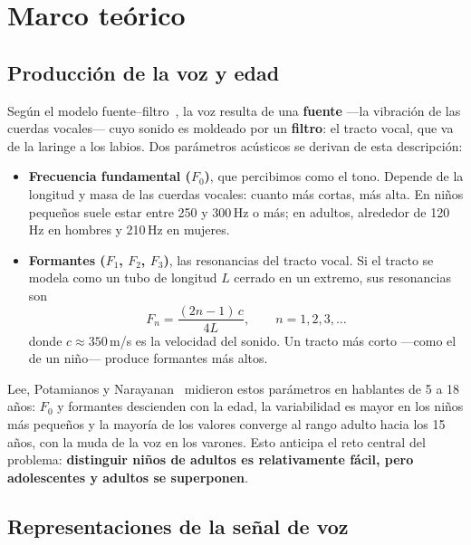 \documentclass[11pt,a4paper]{article}
\begin{document}
\section{Marco teórico}
\label{sec:marco}

\subsection{Producción de la voz y edad}

Según el modelo fuente--filtro~\cite{fant1960}, la voz resulta de una \textbf{fuente} ---la vibración de las cuerdas vocales--- cuyo sonido es moldeado por un \textbf{filtro}: el tracto vocal, que va de la laringe a los labios. Dos parámetros acústicos se derivan de esta descripción:

\begin{itemize}
  \item \textbf{Frecuencia fundamental ($F_0$)}, que percibimos como el tono. Depende de la longitud y masa de las cuerdas vocales: cuanto más cortas, más alta. En niños pequeños suele estar entre 250 y 300\,Hz o más; en adultos, alrededor de 120\,Hz en hombres y 210\,Hz en mujeres.
  \item \textbf{Formantes ($F_1$, $F_2$, $F_3$)}, las resonancias del tracto vocal. Si el tracto se modela como un tubo de longitud $L$ cerrado en un extremo, sus resonancias son
  \begin{equation}
    F_n = \frac{(2n-1)\,c}{4L}, \qquad n = 1, 2, 3, \dots
  \end{equation}
  donde $c \approx 350$\,m/s es la velocidad del sonido. Un tracto más corto ---como el de un niño--- produce formantes más altos.
\end{itemize}

Lee, Potamianos y Narayanan~\cite{lee1999} midieron estos parámetros en hablantes de 5 a 18 años: $F_0$ y formantes descienden con la edad, la variabilidad es mayor en los niños más pequeños y la mayoría de los valores converge al rango adulto hacia los 15 años, con la muda de la voz en los varones. Esto anticipa el reto central del problema: \textbf{distinguir niños de adultos es relativamente fácil, pero adolescentes y adultos se superponen}.

\subsection{Representaciones de la señal de voz}
\end{document}

